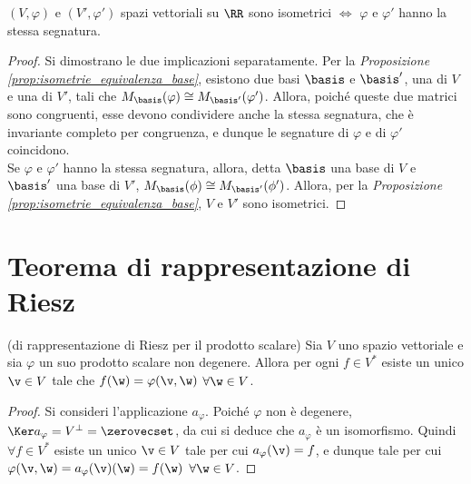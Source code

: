 \begin{proposition} $(V, \varphi)$ e $(V', \varphi')$ spazi vettoriali
	su $\RR$ sono
	isometrici $\iff$ $\varphi$ e $\varphi'$ hanno la stessa segnatura.
\end{proposition}

\begin{proof}Si dimostrano le due implicazioni separatamente.\nl\nl
	\rightproof Per la \textit{Proposizione \ref{prop:isometrie_equivalenza_base}}, esistono due basi $\basis$ e $\basis'$, una di $V$ e una di $V'$,
	tali che $M_\basis(\varphi) \cong M_{\basis'}(\varphi')$. Allora, poiché queste due matrici sono congruenti, esse devono condividere anche la stessa
	segnatura, che è invariante completo per congruenza, e dunque le segnature di $\varphi$ e di $\varphi'$ coincidono. \\
	
	\leftproof Se $\varphi$ e $\varphi'$ hanno la stessa segnatura, allora, detta $\basis$
	una base di $V$ e $\basis'$ una base di $V'$, $M_\basis(\phi) \cong M_{\basis'}(\phi')$.
	Allora, per la \textit{Proposizione \ref{prop:isometrie_equivalenza_base}}, $V$ e $V'$ sono isometrici.
\end{proof}

\section{Teorema di rappresentazione di Riesz}

\begin{theorem} (di rappresentazione di Riesz per il prodotto scalare) 
	Sia $V$ uno spazio vettoriale e sia $\varphi$ un suo prodotto scalare
	non degenere. Allora per ogni $f \in V^*$ esiste un unico $\v \in V$ tale che
	$f(\w) = \varphi(\v, \w)$ $\forall \w \in V$.
\end{theorem}

\begin{proof}
	Si consideri l'applicazione $a_\varphi$. Poiché $\varphi$ non è degenere, $\Ker a_\varphi = V^\perp = \zerovecset$, da cui si deduce che $a_\varphi$ è un isomorfismo. Quindi $\forall f \in V^*$ esiste
	un unico $\v \in V$ tale per cui $a_\varphi(\v) = f$, e dunque tale per cui $\varphi(\v, \w) = a_\varphi(\v)(\w) = f(\w)$ $\forall \w \in V$.
\end{proof}

